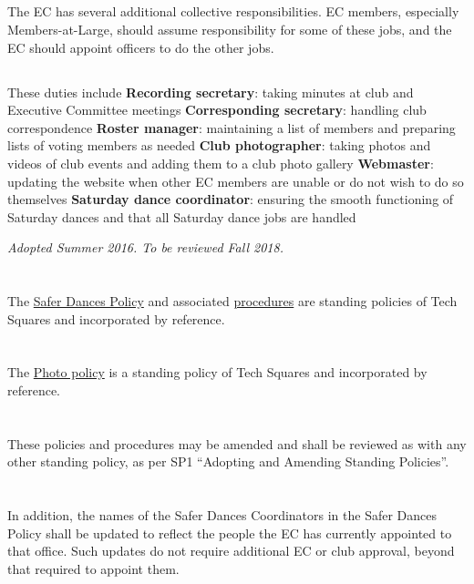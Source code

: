 \documentclass{bylaws}
\newcommand{\sptimes}[2]{\emph{Adopted #1. To be reviewed #2.}}
\begin{document}
\subsection{}The EC has several additional collective responsibilities. EC members, especially Members-at-Large, should assume responsibility for some of these jobs, and the EC should appoint officers to do the other jobs.
\subsection{}These duties include
\duty \textbf{Recording secretary}: taking minutes at club and Executive Committee meetings
\duty \textbf{Corresponding secretary}: handling club correspondence
\duty \textbf{Roster manager}: maintaining a list of members and preparing lists of voting members as needed
\duty \textbf{Club photographer}: taking photos and videos of club events and adding them to a club photo gallery
\duty \textbf{Webmaster}: updating the website when other EC members are unable or do not wish to do so themselves
\duty \textbf{Saturday dance coordinator}: ensuring the smooth functioning of Saturday dances and that all Saturday dance jobs are handled

\label{pol:safer}
\sptimes{Summer 2016}{Fall 2018}

\section{} The \href{safer-dances.html}{Safer Dances Policy} and associated \href{safer-dances-procedures.html}{procedures} are standing policies of Tech Squares and incorporated by reference.
\section{} The \href{photo.html}{Photo policy} is a standing policy of Tech Squares and incorporated by reference.
\section{} These policies and procedures may be amended and shall be reviewed as with any other standing policy, as per SP1 ``Adopting and Amending Standing Policies''.
\section{} In addition, the names of the Safer Dances Coordinators in the Safer Dances Policy shall be updated to reflect the people the EC has currently appointed to that office. Such updates do not require additional EC or club approval, beyond that required to appoint them.
\end{document}
